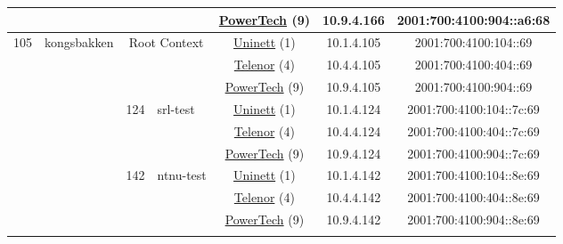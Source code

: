 \begin{small}
\begin{center}
\begin{longtable}{|c|c|c|c|c|c|c|c|}
  &  &  &  & \multicolumn{2}{|c|}{\tiny{\href{http://www.powertech.no}{PowerTech} (9)}} & \tiny{10.9.4.166} & \tiny{2001:700:4100:904::a6:68} \\ \hline
 \multirow{21}{*}{\tiny{105}} & \multicolumn{1}{|l|}{\multirow{21}{*}{\tiny{kongsbakken}}} & \multicolumn{2}{|c|}{\multirow{3}{*}{\tiny{Root Context}}} & \multicolumn{2}{|c|}{\tiny{\href{https://www.uninett.no}{Uninett} (1)}} & \tiny{10.1.4.105} & \tiny{2001:700:4100:104::69} \\* \cline{5-5}\cline{6-6}\cline{7-7}\cline{8-8}
  &  & \multicolumn{2}{|c|}{} & \multicolumn{2}{|c|}{\tiny{\href{https://www.telenor.no}{Telenor} (4)}} & \tiny{10.4.4.105} & \tiny{2001:700:4100:404::69} \\* \cline{5-5}\cline{6-6}\cline{7-7}\cline{8-8}
  &  & \multicolumn{2}{|c|}{} & \multicolumn{2}{|c|}{\tiny{\href{http://www.powertech.no}{PowerTech} (9)}} & \tiny{10.9.4.105} & \tiny{2001:700:4100:904::69} \\* \cline{3-3}\cline{4-4}\cline{5-5}\cline{6-6}\cline{7-7}\cline{8-8}
  &  & \multirow{3}{*}{\tiny{124}} & \multicolumn{1}{|l|}{\multirow{3}{*}{\tiny{srl-test}}} & \multicolumn{2}{|c|}{\tiny{\href{https://www.uninett.no}{Uninett} (1)}} & \tiny{10.1.4.124} & \tiny{2001:700:4100:104::7c:69} \\* \cline{5-5}\cline{6-6}\cline{7-7}\cline{8-8}
  &  &  &  & \multicolumn{2}{|c|}{\tiny{\href{https://www.telenor.no}{Telenor} (4)}} & \tiny{10.4.4.124} & \tiny{2001:700:4100:404::7c:69} \\* \cline{5-5}\cline{6-6}\cline{7-7}\cline{8-8}
  &  &  &  & \multicolumn{2}{|c|}{\tiny{\href{http://www.powertech.no}{PowerTech} (9)}} & \tiny{10.9.4.124} & \tiny{2001:700:4100:904::7c:69} \\* \cline{3-3}\cline{4-4}\cline{5-5}\cline{6-6}\cline{7-7}\cline{8-8}
  &  & \multirow{3}{*}{\tiny{142}} & \multicolumn{1}{|l|}{\multirow{3}{*}{\tiny{ntnu-test}}} & \multicolumn{2}{|c|}{\tiny{\href{https://www.uninett.no}{Uninett} (1)}} & \tiny{10.1.4.142} & \tiny{2001:700:4100:104::8e:69} \\* \cline{5-5}\cline{6-6}\cline{7-7}\cline{8-8}
  &  &  &  & \multicolumn{2}{|c|}{\tiny{\href{https://www.telenor.no}{Telenor} (4)}} & \tiny{10.4.4.142} & \tiny{2001:700:4100:404::8e:69} \\* \cline{5-5}\cline{6-6}\cline{7-7}\cline{8-8}
  &  &  &  & \multicolumn{2}{|c|}{\tiny{\href{http://www.powertech.no}{PowerTech} (9)}} & \tiny{10.9.4.142} & \tiny{2001:700:4100:904::8e:69} \\* \cline{3-3}\cline{4-4}\cline{5-5}\cline{6-6}\cline{7-7}\cline{8-8}

\end{longtable}
\end{center}
\end{small}
